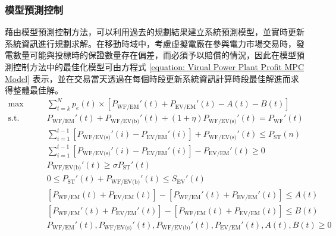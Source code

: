 \subsubsection{模型預測控制}

藉由模型預測控制方法，可以利用過去的規劃結果建立系統預測模型，並實時更新系統資訊進行規劃求解。在移動時域中，考慮虛擬電廠在參與電力市場交易時，發電數量可能與投標時的保證數量存在偏差，而必須予以賠償的情況，因此在模型預測控制方法中的最佳化模型可由方程式 \eqref{equation: Virual Power Plant Profit MPC Model} 表示，並在交易當天透過在每個時段更新系統資訊計算時段最佳解進而求得整體最佳解。
%
\begin{subequations}\label{equation: Virual Power Plant Profit MPC Model}
  \begin{alignat}{2}
    \max        \qquad & \sum_{t = k}^{N} p_{e}(t) \times [P_{\text{WF/EM}}'(t) + P_{\text{EV/EM}}'(t) - A(t) - B(t)] \label{subequation: Virual Power Plant Profit MPC Model 1} \\
    \text{s.t.} \qquad & P_{\text{WF/EM}}'(t) + P_{\text{WF/EV(b)}}'(t) + (1 + \eta)P_{\text{WF/EV(s)}}'(t) = P_{\text{WF}}'(t) \label{subequation: Virual Power Plant Profit MPC Model 2} \\
                       & \sum_{i=1}^{t-1} \left[ P_{\text{WF/EV(s)}}'(i) - P_{\text{EV/EM}}'(i) \right] + P_{\text{WF/EV(s)}}'(t) \leq P_{\text{ST}}(n) \label{subequation: Virual Power Plant Profit MPC Model 3} \\
                       & \sum_{i=1}^{t-1} \left[ P_{\text{WF/EV(s)}}'(i) - P_{\text{EV/EM}}'(i) \right] - P_{\text{EV/EM}}'(t) \geq 0 \label{subequation: Virual Power Plant Profit MPC Model 4} \\
                       & P_{\text{WF/EV(b)}}'(t) \geq \sigma P_{\text{ST}}'(t) \label{subequation: Virual Power Plant Profit MPC Model 5} \\
                       & 0 \leq P_{\text{ST}}'(t) + P_{\text{WF/EV(b)}}'(t) \leq S_{\text{EV}}'(t) \label{subequation: Virual Power Plant Profit MPC Model 6} \\
                       & [P_{\text{WF/EM}}(t) + P_{\text{EV/EM}}(t)] - [P_{\text{WF/EM}}'(t) + P_{\text{EV/EM}}'(t)] \leq A(t) \label{subequation: Virual Power Plant Profit MPC Model 7} \\
                       & [P_{\text{WF/EM}}'(t) + P_{\text{EV/EM}}'(t)] - [P_{\text{WF/EM}}(t) + P_{\text{EV/EM}}(t)] \leq B(t) \label{subequation: Virual Power Plant Profit MPC Model 8} \\
                       & P_{\text{WF/EM}}'(t), P_{\text{WF/EV(s)}}'(t),  P_{\text{WF/EV(b)}}'(t),P_{\text{EV/EM}}'(t),A(t),B(t) \geq 0 \label{subequation: Virual Power Plant Profit MPC Model 9}
  \end{alignat}
\end{subequations}
